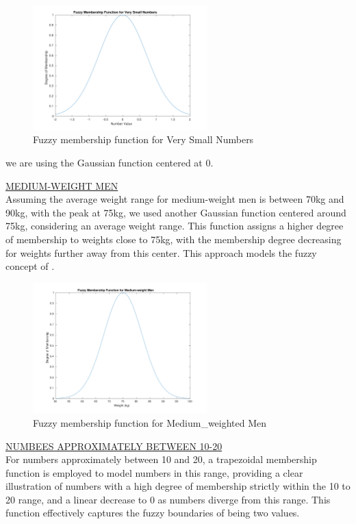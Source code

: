 \begin{figure}[H]
	\centering
	\includegraphics[width=0.6\textwidth]{../Problem 7/small_int.pdf}
	\caption{Fuzzy membership function for Very Small Numbers}	
\end{figure}
we are using the Gaussian function centered at 0.
\vspace{5mm}

\underline{MEDIUM-WEIGHT MEN}\\
Assuming the average weight range for medium-weight men is between 70kg and 90kg, with the peak at 75kg, we used another Gaussian function centered around 75kg, considering an average weight range. This function assigns a higher degree of membership to weights close to 75kg, with the membership degree decreasing for weights further away from this center. This approach models the fuzzy concept of .

\begin{figure}[H]
	\centering
	\includegraphics[width=0.6\textwidth]{../Problem 7/medium_weight.pdf}
	\caption{Fuzzy membership function for Medium\_weighted Men}	
\end{figure}
\vspace{5mm}

\underline{NUMBEES APPROXIMATELY BETWEEN 10-20}\\
For numbers approximately between 10 and 20, a trapezoidal membership function is employed to model numbers in this range, providing a clear illustration of numbers with a high degree of membership strictly within the 10 to 20 range, and a linear decrease to 0 as numbers diverge from this range. This function effectively captures the fuzzy boundaries of being  two values.

